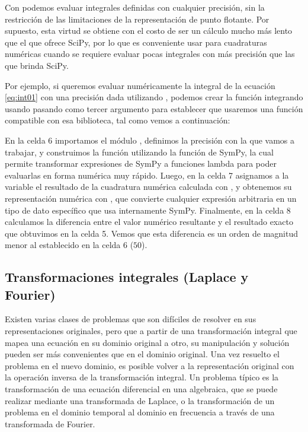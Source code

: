 Con  podemos evaluar integrales definidas con cualquier precisión, sin la restricción de las limitaciones de la representación de punto flotante. Por supuesto, esta virtud se obtiene con el costo de ser un cálculo mucho más lento que el que ofrece SciPy, por lo que es conveniente usar  para cuadraturas numéricas cuando se requiere evaluar pocas integrales con más precisión que las que brinda SciPy. 

Por ejemplo, si queremos evaluar numéricamente la integral de la ecuación \eqref{eq:int01} con una precisión dada utilizando , podemos crear la función integrando usando  pasando  como tercer argumento para establecer que usaremos una función compatible con esa biblioteca, tal como vemos a continuación:

En la celda 6 importamos el módulo , definimos la precisión con la que vamos a trabajar, y construimos la función  utilizando la función  de SymPy, la cual permite transformar expresiones de SymPy a funciones lambda para poder evaluarlas en forma numérica muy rápido. Luego, en la celda 7 asignamos a la variable  el resultado de la cuadratura numérica calculada con , y obtenemos su representación numérica con , que convierte cualquier expresión arbitraria en un tipo de dato específico que usa internamente SymPy. Finalmente, en la celda 8 calculamos la diferencia entre el valor numérico resultante y el resultado exacto que obtuvimos en la celda 5. Vemos que esta diferencia es un orden de magnitud menor al establecido en la celda 6 ($50$).

\subsection{Transformaciones integrales (Laplace y Fourier)}
Existen varias clases de problemas que son difíciles de resolver en sus representaciones originales, pero que a partir de una transformación integral que mapea una ecuación en su dominio original a otro, su manipulación y solución pueden ser más convenientes que en el dominio original. Una vez resuelto el problema en el nuevo dominio, es posible volver a la representación original con la operación inversa de la transformación integral. Un problema típico es la transformación de una ecuación diferencial en una algebraica, que se puede realizar mediante una transformada de Laplace, o la transformación de un problema en el dominio temporal al dominio en frecuencia a través de una transformada de Fourier.

